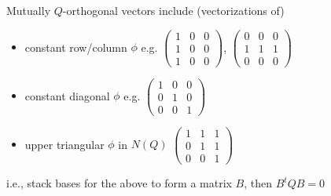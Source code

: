 \documentclass{beamer}
\newcommand{\Q}{Q}
\begin{document}
\begin{frame}
  Mutually $\Q$-orthogonal vectors include (vectorizations of)
  \begin{itemize}
  \item constant row/column $\phi$ e.g.
    $\begin{pmatrix}
      1 & 0 & 0\\
      1 & 0 & 0\\
      1 & 0 & 0
    \end{pmatrix}$,
    $\begin{pmatrix}
      0 & 0 & 0\\
      1 & 1 & 1\\
      0 & 0 & 0
    \end{pmatrix}$
  \item constant diagonal $\phi$ e.g.
        $\begin{pmatrix}
      1 & 0 & 0\\
      0 & 1 & 0\\
      0 & 0 & 1
    \end{pmatrix}$
  \item upper triangular $\phi$ in $N(\Q)$
    $\begin{pmatrix}
      1 & 1 & 1\\
      0 & 1 & 1\\
      0 & 0 & 1
    \end{pmatrix}$
  \end{itemize}
  i.e., stack bases for the above to form a matrix $B$, then $B^tQB=0$
\end{frame}
\end{document}
